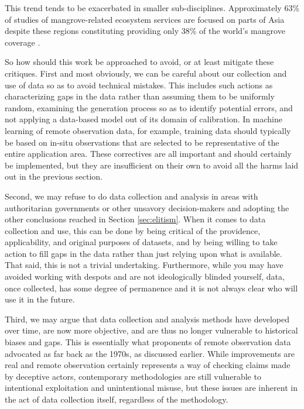 This trend tends to be exacerbated in smaller sub-disciplines. Approximately 63\% of studies of mangrove-related ecosystem services are focused on parts of Asia despite these regions constituting providing only 38\% of the world’s mangrove coverage \cite{veghMangroveEcosystemServices2014}.

So how should this work be approached to avoid, or at least mitigate these critiques. First and most obviously, we can be careful about our collection and use of data so as to avoid technical mistakes. This includes such actions as characterizing gaps in the data rather than assuming them to be uniformly random, examining the generation process so as to identify potential errors, and not applying a data-based model out of its domain of calibration. In machine learning of remote observation data, for example, training data should typically be based on in-situ observations that are selected to be representative of the entire application area. These correctives are all important and should certainly be implemented, but they are insufficient on their own to avoid all the harms laid out in the previous section.

Second, we may refuse to do data collection and analysis in areas with authoritarian governments or other unsavory decision-makers and adopting the other conclusions reached in Section \ref{sec:elitism}. When it comes to data collection and use, this can be done by being critical of the providence, applicability, and original purposes of datasets, and by being willing to take action to fill gaps in the data rather than just relying upon what is available. That said, this is not a trivial undertaking. Furthermore, while you may have avoided working with despots and are not ideologically blinded yourself, data, once collected, has some degree of permanence and it is not always clear who will use it in the future.

Third, we may argue that data collection and analysis methods have developed over time, are now more objective, and are thus no longer vulnerable to historical biases and gaps. This is essentially what proponents of remote observation data advocated as far back as the 1970s, as discussed earlier. While improvements are real and remote observation certainly represents a way of checking claims made by deceptive actors, contemporary methodologies are still vulnerable to intentional exploitation and unintentional misuse, but these issues are inherent in the act of data collection itself, regardless of the methodology.

